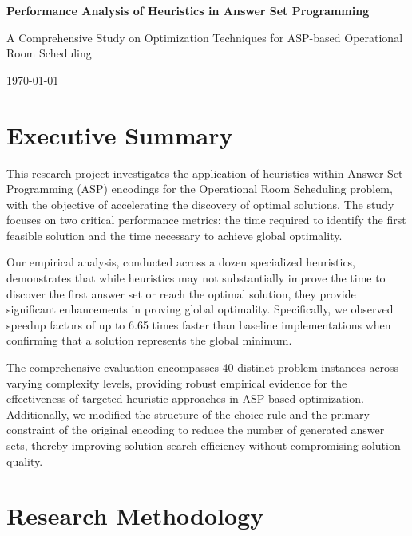 \documentclass[11pt,a4paper]{article}
\begin{document}
\begin{titlepage}
    \centering
    \vspace*{2cm}
    
    {\Huge\bfseries Performance Analysis of Heuristics in Answer Set Programming}
    
    \vspace{1.5cm}
    
    {\Large A Comprehensive Study on Optimization Techniques for ASP-based Operational Room Scheduling}
    
    \vspace{10.5cm}

    {\large \today}
    
    \vfill
\end{titlepage}

\newpage

\section{Executive Summary}

This research project investigates the application of heuristics within Answer Set Programming (ASP) encodings for the Operational Room Scheduling problem, with the objective of accelerating the discovery of optimal solutions. The study focuses on two critical performance metrics: the time required to identify the first feasible solution and the time necessary to achieve global optimality.

Our empirical analysis, conducted across a dozen specialized heuristics, demonstrates that while heuristics may not substantially improve the time to discover the first answer set or reach the optimal solution, they provide significant enhancements in proving global optimality. Specifically, we observed speedup factors of up to 6.65 times faster than baseline implementations when confirming that a solution represents the global minimum.

The comprehensive evaluation encompasses 40 distinct problem instances across varying complexity levels, providing robust empirical evidence for the effectiveness of targeted heuristic approaches in ASP-based optimization. Additionally, we modified the structure of the choice rule and the primary constraint of the original encoding to reduce the number of generated answer sets, thereby improving solution search efficiency without compromising solution quality.

\section{Research Methodology}
\end{document}
